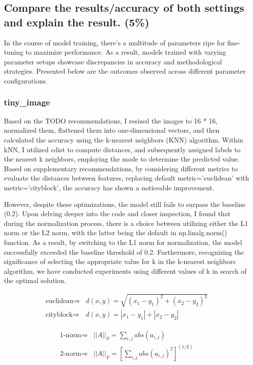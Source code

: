 \documentclass[a4paper, 12pt]{article}
\begin{document}
\subsection{Compare the results/accuracy of both settings and explain the result. (5\%)}
In the course of model training, there's a multitude of parameters ripe for fine-tuning to maximize performance. As a result, models trained with varying parameter setups showcase discrepancies in accuracy and methodological strategies. Presented below are the outcomes observed across different parameter configurations.

\subsubsection{tiny\_image}
Based on the TODO recommendations, I resized the images to 16 * 16, normalized them, flattened them into one-dimensional vectors, and then calculated the accuracy using the k-nearest neighbors (KNN) algorithm. Within kNN, I utilized cdist to compute distances, and subsequently assigned labels to the nearest k neighbors, employing the mode to determine the predicted value. Based on supplementary recommendations, by considering different metrics to evaluate the distances between features, replacing default metric='euclidean' with metric='cityblock', the accuracy has shown a noticeable improvement.

However, despite these optimizations, the model still fails to surpass the baseline (0.2). Upon delving deeper into the code and closer inspection,  I found that during the normalization process, there is a choice between utilizing either the L1 norm or the L2 norm, with the latter being the default in np.linalg.norm() function. As a result, by switching to the L1 norm for normalization, the model successfully exceeded the baseline threshold of 0.2. Furthermore, recognizing the significance of selecting the appropriate value for k in the k-nearest neighbors algorithm, we have conducted experiments using different values of k in search of the optimal solution.

\vspace{2em}

\begin{align*}
    \text{euclidean}\Rightarrow & d(x,y)=\sqrt{(x_1-y_1)^2+(x_2-y_2)^2} \\
    \text{cityblock}\Rightarrow & d(x,y)=|x_1-y_1|+|x_2-y_2|
\end{align*}

\begin{align*}
    \text{1-norm}\Rightarrow & ||A||_S = \sum_{i,j}abs(a_{i,j})                        \\
    \text{2-norm}\Rightarrow & ||A||_F = \left[\sum_{i,j}abs(a_{i,j})^2\right]^{(1/2)}
\end{align*}
\end{document}
